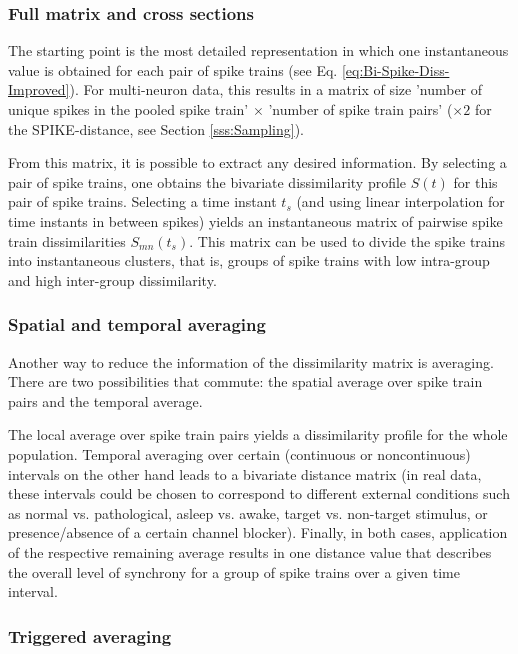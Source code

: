 \documentclass[10pt,twocolumn]{elsart5p}
\begin{document}
\subsubsection{\label{sss:Full-matrix-and-cross-sections} Full matrix and cross sections}

The starting point is the most detailed representation in which one instantaneous value is obtained for each pair of spike trains (see Eq. \ref{eq:Bi-Spike-Diss-Improved}). For multi-neuron data, this results in a matrix of size 'number of unique spikes in the pooled spike train' $\times$ 'number of spike train pairs' ($\times 2$ for the SPIKE-distance, see Section \ref{sss:Sampling}).

From this matrix, it is possible to extract any desired information. By selecting a pair of spike trains, one obtains the bivariate dissimilarity profile $S (t)$ for this pair of spike trains. Selecting a time instant $t_s$ (and using linear interpolation for time instants in between spikes) yields an instantaneous matrix of pairwise spike train dissimilarities $S_{mn}(t_s)$. This matrix can be used to divide the spike trains into instantaneous clusters, that is, groups of spike trains with low intra-group and high inter-group dissimilarity.

\subsubsection{\label{sss:Spatial-and-temporal-Averaging} Spatial and temporal averaging}

Another way to reduce the information of the dissimilarity matrix is averaging. There are two possibilities that commute: the spatial average over spike train pairs and the temporal average.

The local average over spike train pairs yields a dissimilarity profile for the whole population. Temporal averaging over certain (continuous or noncontinuous) intervals on the other hand leads to a bivariate distance matrix (in real data, these intervals could be chosen to correspond to different external conditions such as normal vs. pathological, asleep vs. awake, target vs. non-target stimulus, or presence/absence of a certain channel blocker). Finally, in both cases, application of the respective remaining average results in one distance value that describes the overall level of synchrony for a group of spike trains over a given time interval.

\subsubsection{\label{sss:Triggered-Averaging} Triggered averaging}
\end{document}
